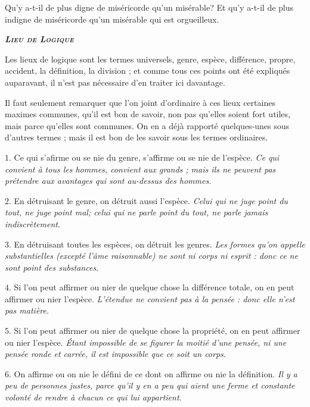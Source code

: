 Qu'y a-t-il de plus digne de miséricorde qu'un misérable? Et qu'y a-t-il de plus indigne de miséricorde qu'un misérable qui est orgueilleux.


\begin{center}\emph{\bfseries\scshape Lieu de Logique}\end{center}

Les lieux de logique sont les termes universels, genre, espèce, différence, propre, accident, la définition, la division ; et comme tous ces points ont été expliqués auparavant, il n'est pas nécessaire d'en traiter ici davantage.

Il faut seulement remarquer que l'on joint d'ordinaire à ces lieux certaines maximes communes, qu'il est bon de savoir, non pas qu'elles soient fort utiles, mais parce qu'elles sont communes. On en a déjà rapporté quelques-unes sous d'autres termes ; mais il est bon de les savoir sous les termes ordinaires.

\bigbreak
$1$. Ce qui s'afirme ou se nie du genre, s'affirme ou se nie de l'espèce. \emph{Ce qui convient à tous les hommes, convient aux grands ; mais ils ne peuvent pas prétendre aux avantages qui sont au-dessus des hommes}.

\bigbreak
$2$. En détruisant le genre, on détruit aussi l'espèce. \emph{Celui qui ne juge point du tout, ne juge point mal; celui qui ne parle point du tout, ne parle jamais indiscrètement}.

\bigbreak
$3$. En détruisant toutes les espèces, on détruit les genres. \emph{Les formes qu'on appelle substantielles (excepté l'âme raisonnable) ne sont ni corps ni esprit : donc ce ne sont point des substances}.

\bigbreak
$4$. Si l'on peut affirmer ou nier de quelque chose la différence totale, on en peut affirmer ou nier l'espèce. \emph{L'étendue ne convient pas à la pensée : donc elle n'est pas matière}.

\bigbreak
$5$. Si l'on peut affirmer ou nier de quelque chose la propriété, on en peut affirmer ou nier l'espèce. \emph{Étant impossible de se figurer la moitié d'une pensée, ni une pensée ronde et carrée, il est impossible que ce soit un corps}.

\bigbreak
$6$. On affirme ou on nie le défini de ce dont on affirme ou nie la définition. \emph{Il y a peu de personnes justes, parce qu'il y en a peu qui aient une ferme et constante volonté de rendre à chacun ce qui lui appartient}.

\newpage

